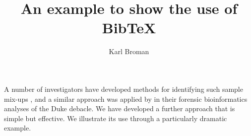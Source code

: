 \documentclass[12pt]{article}
\title{An example to show the use of BibTeX}
\author{Karl Broman}
\begin{document}
\maketitle

A number of investigators have developed methods for identifying such
sample mix-ups \citep{Westra2011, Schadt2012, Lynch2012, Ekstrom2012},
and a similar approach was applied by \citet{Baggerly2008,
Baggerly2009} in their forensic bioinformatics analyses of the Duke
debacle.  We have developed a further approach that is simple but
effective.  We illustrate its use through a particularly dramatic
example.


\renewcommand*{\refname}{\centerline{\normalsize\sffamily \textbf{Literature Cited}}}

\end{document}
